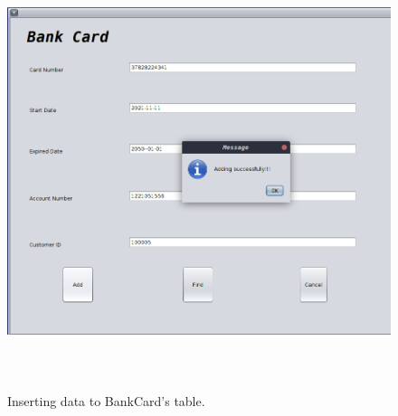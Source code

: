 \documentclass[12pt,a4paper]{article}
\begin{document}
\begin{figure}[H]
        \centering
        \includegraphics[width=5.5in,height=5in]{Picture/insertCard.png}
        \caption{Inserting data to BankCard's table.}
    \end{figure}
\end{document}
